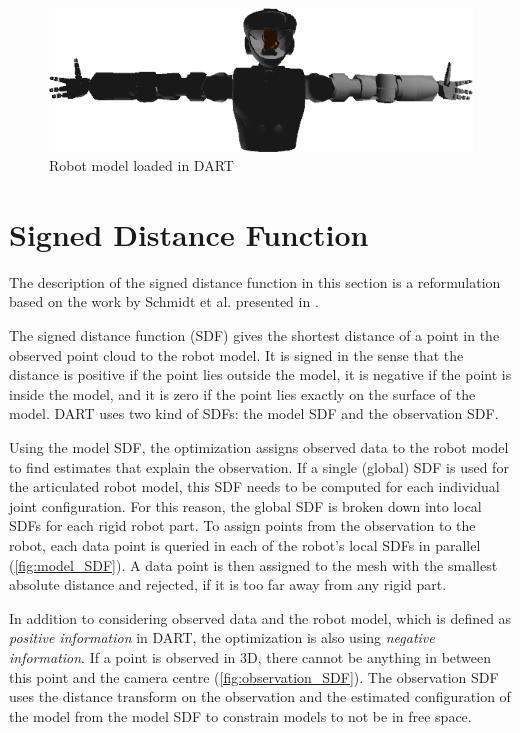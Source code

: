\begin{figure}
\centering
\includegraphics[width=\textwidth]{images/valkyrie/val_model_torso_dart.png}
\caption{Robot model loaded in DART}
\label{fig:val_model_dart}
\end{figure}


\section{Signed Distance Function}

The description of the signed distance function in this section is a reformulation based on the work by Schmidt et al. presented in \cite{Schmidt2015}.

The signed distance function (SDF) gives the shortest distance of a point in the observed point cloud to the robot model. It is signed in the sense that the distance is positive if the point lies outside the model, it is negative if the point is inside the model, and it is zero if the point lies exactly on the surface of the model. DART uses two kind of SDFs: the model SDF and the observation SDF.

Using the model SDF, the optimization assigns observed data to the robot model to find estimates that explain the observation. If a single (global) SDF is used for the articulated robot model, this SDF needs to be computed for each individual joint configuration. For this reason, the global SDF is broken down into local SDFs for each rigid robot part. To assign points from the observation to the robot, each data point is queried in each of the robot's local SDFs in parallel (\cref{fig:model_SDF}). A data point is then assigned to the mesh with the smallest absolute distance and rejected, if it is too far away from any rigid part.

In addition to considering observed data and the robot model, which is defined as \textit{positive information} in DART, the optimization is also using \textit{negative information}. If a point is observed in 3D, there cannot be anything in between this point and the camera centre (\cref{fig:observation_SDF}). The observation SDF uses the distance transform on the observation and the estimated configuration of the model from the model SDF to constrain models to not be in free space.


